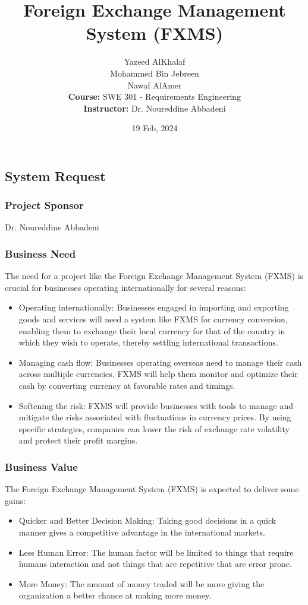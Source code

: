 \documentclass[a4paper]{report}
\title{Foreign Exchange Management System (FXMS)}
\author{
    Yazeed AlKhalaf \\
    Mohammed Bin Jebreen \\
    Nawaf AlAmer \\
    \textbf{Course:} SWE 301 - Requirements Engineering \\
    \textbf{Instructor:} Dr. Noureddine Abbadeni
}
\date{19 Feb, 2024}
\begin{document}
\maketitle

\newpage

\chapter{}

\section{System Request}

\subsection{Project Sponsor}
Dr. Noureddine Abbadeni

\subsection{Business Need}
The need for a project like the Foreign Exchange Management System (FXMS) is crucial for businesses operating internationally for several reasons:
\begin{itemize}
    \item Operating internationally: Businesses engaged in importing and exporting goods and services will need a system like FXMS for currency conversion, enabling them to exchange their local currency for that of the country in which they wish to operate, thereby settling international transactions.
    \item Managing cash flow: Businesses operating overseas need to manage their cash across multiple currencies. FXMS will help them monitor and optimize their cash by converting currency at favorable rates and timings.
    \item Softening the risk: FXMS will provide businesses with tools to manage and mitigate the risks associated with fluctuations in currency prices. By using specific strategies, companies can lower the risk of exchange rate volatility and protect their profit margins.
\end{itemize}

\subsection{Business Value}
The Foreign Exchange Management System (FXMS) is expected to deliver some gains:
\begin{itemize}
    \item Quicker and Better Decision Making: Taking good decisions in a quick manner gives a competitive advantage in the international markets.
    \item Less Human Error: The human factor will be limited to things that require humans interaction and not things that are repetitive that are error prone.
    \item More Money: The amount of money traded will be more giving the organization a better chance at making more money.
\end{itemize}
\end{document}
